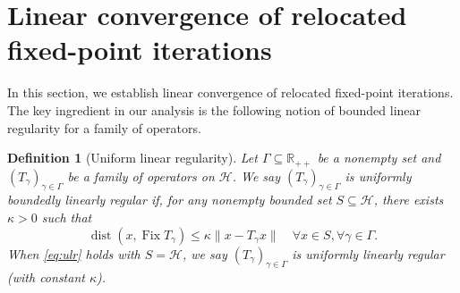 \documentclass[a4paper,12pt]{article}
\newtheorem{definition}[theorem]{Definition}
\DeclareMathOperator{\Fix}{Fix}
\DeclareMathOperator{\dist}{dist}
\begin{document}
\section{Linear convergence of relocated fixed-point iterations}\label{section: 3}
In this section, we establish linear convergence of  relocated fixed-point iterations. %
The key ingredient in our analysis is the following notion of bounded linear regularity for a family of operators.
\begin{definition}[Uniform linear regularity]\label{def: bounded linear regularity}
    Let $\Gamma\subseteq\mathbb{R}_{++}$ be a nonempty set and $(T_{\gamma})_{\gamma \in \Gamma}$ be a family of operators on $\mathcal{H}$. We say $(T_{\gamma})_{\gamma \in \Gamma}$ is \emph{uniformly boundedly linearly regular} if, for any nonempty bounded set $S \subseteq \mathcal{H}$, there exists $\kappa >0$ such that
    \begin{equation}\label{eq:ulr}
    \dist(x, \Fix T_\gamma)\leq \kappa \|x - T_\gamma x\|\quad\forall x \in S,\forall \gamma\in\Gamma.
\end{equation}
When \eqref{eq:ulr} holds with $S=\mathcal{H}$, we say $(T_{\gamma})_{\gamma \in \Gamma}$ is \emph{uniformly linearly regular} (with constant $\kappa$). 
\end{definition}
\end{document}
